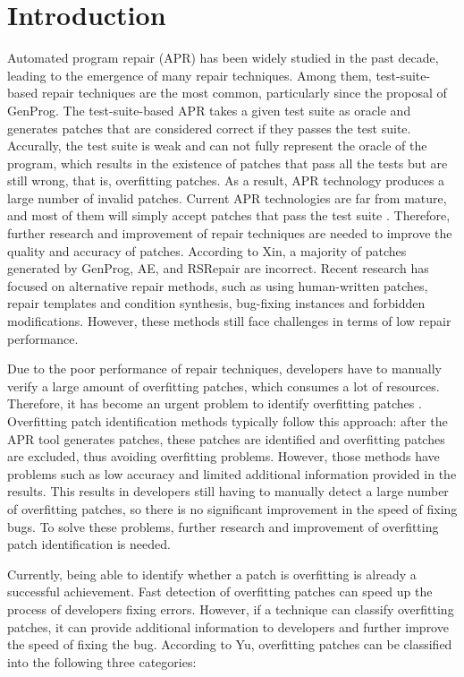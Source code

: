 \section{Introduction}
\label{1}
Automated program repair (APR) has been widely studied in the past decade, leading to the emergence of many repair techniques. Among them, test-suite-based repair techniques are the most common, particularly since the proposal of GenProg\cite{ref1,ref2,ref3}. The test-suite-based APR takes a given test suite as oracle and generates patches that are considered correct if they passes the test suite. Accurally, the test suite is weak and can not fully represent the oracle of the program, which results in the existence of patches that pass all the tests but are still wrong, that is, overfitting patches. As a result, APR technology produces a large number of invalid patches. Current APR technologies are far from mature, and most of them will simply accept patches that pass the test suite . Therefore, further research and improvement of repair techniques are needed to improve the quality and accuracy of patches. According to Xin\cite{ref4}, a majority of patches generated by GenProg, AE, and RSRepair are incorrect. Recent research has focused on alternative repair methods, such as using human-written patches, repair templates and condition synthesis, bug-fixing instances  and forbidden modifications. However, these methods still face challenges in terms of low repair performance.

Due to the poor performance of repair techniques, developers have to manually verify a large amount of  overfitting patches, which consumes a lot of resources. Therefore, it has become an urgent problem to identify overfitting patches . Overfitting patch identification  methods typically follow this approach: after the APR tool generates patches, these patches are identified and overfitting patches are excluded, thus avoiding overfitting problems. However, those methods have problems such as low accuracy and limited additional information provided in the results. This results in developers still having to manually detect a large number of overfitting patches, so there is no significant improvement in the speed of fixing bugs. To solve these problems, further research and improvement of overfitting patch identification is needed.

Currently, being able to identify whether a patch is overfitting is already a successful achievement. Fast detection of overfitting patches can speed up the process of developers fixing errors. However, if a technique can classify overfitting patches, it can provide additional information to developers and further improve the speed of fixing the bug. According to Yu\cite{ref5}, overfitting patches can be classified into the following three categories:


